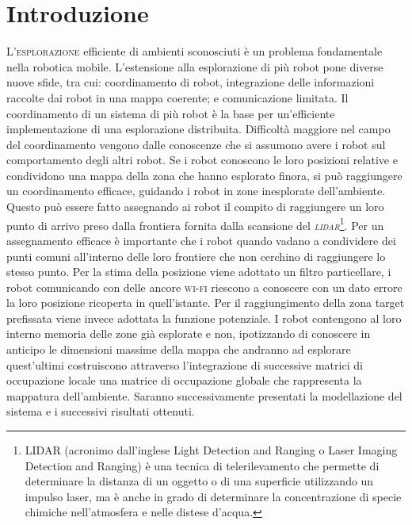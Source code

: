 \section{Introduzione}
\lettrine[lines=3]{L'}{esplorazione} efficiente di ambienti sconosciuti è un 
problema fondamentale nella robotica mobile. 
L'estensione alla esplorazione di più robot pone diverse nuove sfide, tra cui: 
coordinamento di robot, integrazione delle informazioni raccolte dai robot in
una mappa coerente; e comunicazione limitata.
Il coordinamento di un sistema di più robot è la base per un'efficiente 
implementazione di una esplorazione distribuita. Difficoltà maggiore nel campo 
del coordinamento vengono dalle conoscenze che si assumono avere i robot sul
comportamento degli altri robot. 
Se i robot conoscono le loro posizioni relative e condividono una mappa della 
zona che hanno esplorato finora, si può raggiungere un coordinamento efficace,
guidando i robot in zone inesplorate dell'ambiente.
Questo può essere fatto assegnando ai robot il compito di raggiungere un loro 
punto di arrivo preso dalla frontiera fornita dalla scansione del 
\emph{\textsc{lidar}}\footnote{LIDAR (acronimo dall'inglese Light Detection and 
Ranging o Laser Imaging Detection and Ranging) è una tecnica di 
telerilevamento che permette di determinare la distanza di un oggetto o di una 
superficie utilizzando un impulso laser, ma è anche in grado di determinare la
concentrazione di specie chimiche nell'atmosfera e nelle distese d'acqua.}.\cite{131810}
Per un assegnamento efficace è importante che i robot quando vadano a 
condividere dei punti comuni all'interno delle loro frontiere che non cerchino 
di raggiungere lo stesso punto.
Per la stima della posizione viene adottato un filtro particellare, i robot 
comunicando con delle ancore \textsc{wi-fi} riescono a conoscere con un dato 
errore la loro posizione ricoperta in quell'istante. Per il raggiungimento 
della zona target prefissata viene invece adottata la funzione potenziale.
I robot contengono al loro interno memoria delle zone già esplorate e non, 
ipotizzando di conoscere in anticipo le dimensioni massime della mappa che 
andranno ad esplorare quest'ultimi costruiscono attraverso l'integrazione di 
successive matrici di occupazione locale una matrice di occupazione globale 
che rappresenta la mappatura dell'ambiente.
Saranno successivamente presentati la modellazione del sistema e i successivi 
risultati ottenuti.
